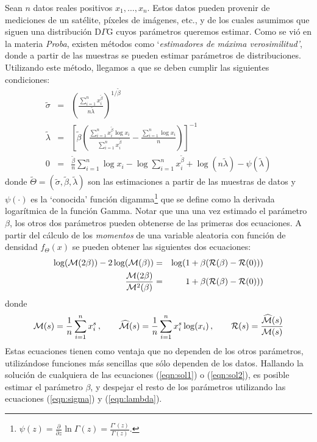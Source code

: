 \documentclass[a4paper,10pt,twoside]{article}
\begin{document}
Sean $n$ datos reales positivos $x_1,\dots,x_n$. Estos datos pueden provenir de mediciones de un sat\'elite, p\'ixeles de im\'agenes, etc., y de los cuales asumimos que siguen una distribuci\'on D$\Gamma$G cuyos par\'ametros queremos estimar. Como se vi\'o en la materia \emph{Proba}, existen m\'etodos como `\textsl{estimadores de m\'axima verosimilitud'}, donde a partir de las muestras se pueden estimar par\'ametros de distribuciones. Utilizando este m\'etodo, llegamos a que se deben cumplir las siguientes condiciones:
\begin{eqnarray}
\tilde{\sigma} & = & \left(\frac{\sum_{i=1}^n{x_i^{\tilde{\beta}}}}{n \tilde{\lambda}} \right)^{1/\tilde{\beta}} \label{eqn:sigma}\\
\tilde{\lambda} & = &\left[ \tilde{\beta} \left( \frac{\sum_{i=1}^n{x_i^{\tilde{\beta}} \log x_i}}{\sum_{i=1}^n{x_i^{\tilde{\beta}}}} - \frac{\sum_{i=1}^n{\log x_i}}{n} \right)\right]^{-1} \label{eqn:lambda}\\
 0 & = & \frac{\tilde{\beta}}{n} \sum_{i=1}^n{\log x_i} - \log {\sum_{i=1}^n{x_i^{\tilde{\beta}}}} + \log(n \tilde{\lambda}) - \psi(\tilde{\lambda})
\end{eqnarray}
donde $\tilde{\Theta}=(\tilde{\sigma},\tilde{\beta},\tilde{\lambda})$ son las estimaciones a partir de las muestras de datos y $\psi(\cdot)$ es la `conocida' funci\'on digamma\footnote{$\psi(z) = \frac{\partial}{\partial z} \ln \Gamma (z) = \frac{\Gamma'(z)}{\Gamma(z)}$.} que se define como la derivada logar\'itmica de la funci\'on Gamma. Notar que una una vez estimado el par\'ametro $\beta$, los otros dos par\'ametros pueden obtenerse de las primeras dos ecuaciones. A partir del c\'alculo de los \textsl{momentos} de una variable aleatoria con funci\'on de densidad $f_\Theta(x)$ se pueden obtener las siguientes dos ecuaciones:
\begin{eqnarray}
\log(\mathcal{M}(2\beta)) -2\log(\mathcal{M}(\beta)) & = & \log(1+\beta(\mathcal{R}(\beta)-\mathcal{R}(0))) \label{eqn:sol1}\\
\frac{\mathcal{M}(2\beta)}{\mathcal{M}^2(\beta)} & = & 1+\beta(\mathcal{R}(\beta)-\mathcal{R}(0))) \label{eqn:sol2}
\end{eqnarray}
donde 
$$\mathcal{M}(s) =  \frac{1}{n}\sum_{i=1}^n{x_i^s}\,, \qquad \widehat{\mathcal{M}}(s) = \frac{1}{n}\sum_{i=1}^n{x_i^s \log(x_i)}\,,  \qquad \mathcal{R}(s) = \frac{\widehat{\mathcal{M}}(s)}{\mathcal{M}(s)}$$
Estas ecuaciones tienen como ventaja que no dependen de los otros par\'ametros, utiliz\'andose funciones m\'as sencillas que s\'olo dependen de los datos. Hallando la soluci\'on de cualquiera de las ecuaciones (\ref{eqn:sol1}) o (\ref{eqn:sol2}), es posible estimar el par\'ametro $\beta$, y despejar el resto de los par\'ametros utilizando las ecuaciones (\ref{eqn:sigma}) y (\ref{eqn:lambda}).
\end{document}
